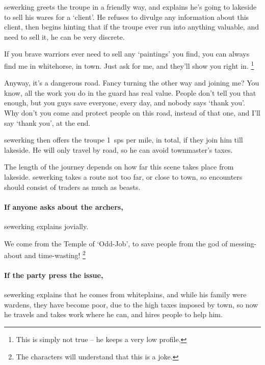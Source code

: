 \setcounter{wounds}{2}

\sewerking


\Gls{sewerking} greets the troupe in a friendly way, and explains he's going to \gls{lakeside} to sell his wares for a `client'.
He refuses to divulge any information about this client, then begins hinting that if the troupe ever run into anything valuable, and need to sell it, he can be very discrete.

\begin{speechtext}
  If you brave warriors ever need to sell any `paintings' you find, you can always find me in \gls{whitehorse}, in \gls{town}.
  Just ask for me, and they'll show you right in.%
  \footnote{This is simply not true -- he keeps a very low profile.}

  Anyway, it's a dangerous road.
  Fancy turning the other way and joining me?
  You know, all the work you do in the \gls{guard} has real value.
  People don't tell you that enough, but you guys save everyone, every day, and nobody says `thank you'.
  Why don't you come and protect people on this road, instead of that one, and I'll say `thank you', at the end.
\end{speechtext}

\Gls{sewerking} then offers the troupe 1~\glspl{sp} per mile, in total, if they join him till \gls{lakeside}.
He will only travel by road, so he can avoid \gls{townmaster}'s taxes.

The length of the journey depends on how far this scene takes place from \gls{lakeside}.
\Gls{sewerking} takes a route not too far, or close to town, so encounters should consist of traders as much as beasts.

\paragraph{If anyone asks about the archers,}
\gls{sewerking} explains jovially.

\begin{speechtext}
  We come from the Temple of `Odd-Job', to save people from the god of messing-about and time-wasting!%
  \footnote{The characters will understand that this is a joke.}
\end{speechtext}

\paragraph{If the party press the issue,}
\gls{sewerking} explains that he comes from \gls{whiteplains}, and while his family were \glspl{warden}, they have become poor, due to the high taxes imposed by \gls{town}, so now he travels and takes work where he can, and hires people to help him.

